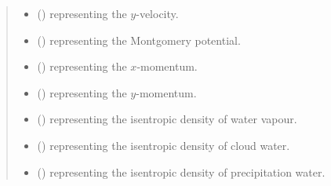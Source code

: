 \documentclass[letterpaper,10pt,english]{sphinxmanual}
\begin{document}
\begin{fulllineitems}
\begin{fulllineitems}
\begin{quote}
\begin{description}
\begin{itemize}
\item {} 
 () \textendash{}  representing the \(y\)-velocity.

\item {} 
 () \textendash{}  representing the Montgomery potential.

\item {} 
 () \textendash{}  representing the \(x\)-momentum.

\item {} 
 () \textendash{}  representing the \(y\)-momentum.

\item {} 
 () \textendash{}  representing the isentropic density of water vapour.

\item {} 
 () \textendash{}  representing the isentropic density of cloud water.

\item {} 
 () \textendash{}  representing the isentropic density of precipitation water.

\end{itemize}

\end{description}\end{quote}

\end{fulllineitems}



\end{fulllineitems}
\end{document}
